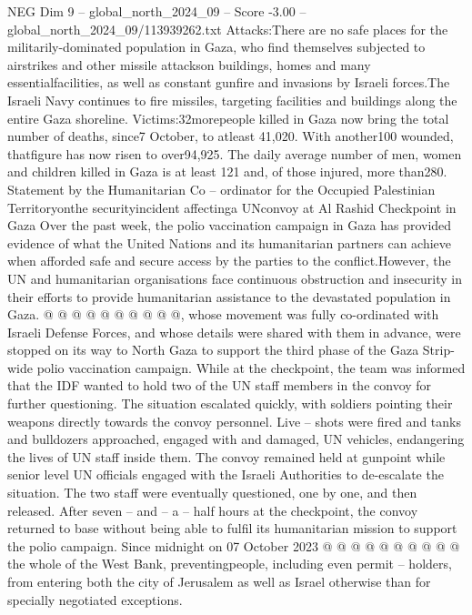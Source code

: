 \begin{textsample}{NEG Dim 9 – global\_north\_2024\_09 – Score -3.00 – global\_north\_2024\_09/113939262.txt}  \label{ex:f9_neg_206}
Attacks:There are no safe places for the militarily-dominated population in Gaza, who find themselves subjected to airstrikes and other missile attackson buildings, homes and many essentialfacilities, as well as constant gunfire and invasions by Israeli forces.The Israeli Navy continues to fire missiles, targeting facilities and buildings along the entire Gaza shoreline.
Victims:32morepeople killed in Gaza now bring the total number of deaths, since7 October, to atleast 41,020.
With another100 wounded, thatfigure has now risen to over94,925.
The daily average number of men, women and children killed in Gaza is at least 121 and, of those injured, more than280.
Statement by the Humanitarian Co -- ordinator for the Occupied Palestinian Territoryonthe securityincident affectinga UNconvoy at Al Rashid Checkpoint in Gaza Over the past week, the polio vaccination campaign in Gaza has provided evidence of what the United Nations and its humanitarian partners can achieve when afforded safe and secure access by the parties to the conflict.However, the UN and humanitarian organisations face continuous obstruction and insecurity in their efforts to provide humanitarian assistance to the devastated population in Gaza. @ @ @ @ @ @ @ @ @ @, whose movement was fully co-ordinated with Israeli Defense Forces, and whose details were shared with them in advance, were stopped on its way to North Gaza to support the third phase of the Gaza Strip-wide polio vaccination campaign.
While at the checkpoint, the team was informed that the IDF wanted to hold two of the UN staff members in the convoy for further questioning.
The situation escalated quickly, with soldiers pointing their weapons directly towards the convoy personnel.
Live -- shots were fired and tanks and bulldozers approached, engaged with and damaged, UN vehicles, endangering the lives of UN staff inside them.
The convoy remained held at gunpoint while senior level UN officials engaged with the Israeli Authorities to de-escalate the situation.
The two staff were eventually questioned, one by one, and then released.
After seven -- and -- a -- half hours at the checkpoint, the convoy returned to base without being able to fulfil its humanitarian mission to support the polio campaign.
Since midnight on 07 October 2023 @ @ @ @ @ @ @ @ @ @ the whole of the West Bank, preventingpeople, including even permit -- holders, from entering both the city of Jerusalem as well as Israel otherwise than for specially negotiated exceptions.

\end{textsample}
